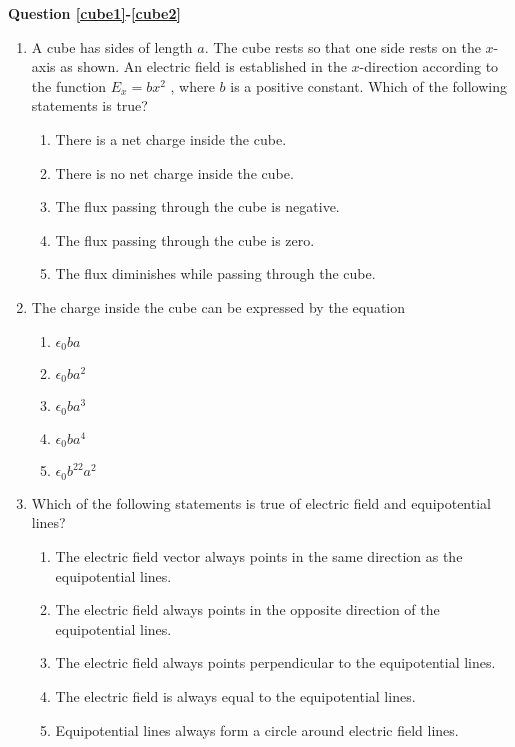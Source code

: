 \documentclass{../../../oss-apphys}
\begin{document}
\begin{multicols}{2}
  \textbf{Question \ref{cube1}-\ref{cube2}}
  \begin{enumerate}[leftmargin=18pt,resume]
  \item A cube has sides of length $a$. The cube rests so that one side rests on
    the $x$-axis as shown. An electric field is established in the $x$-direction
    according to the function $E_x=bx^2$ , where $b$ is a positive constant.
    Which of the following statements is true?
    \label{cube1}
    \begin{enumerate}[noitemsep,topsep=0pt,leftmargin=18pt,label=(\Alph*)]
    \item\vspace{-.2in}There is a net charge inside the cube.
    \item There is no net charge inside the cube.
    \item The flux passing through the cube is negative.
    \item The flux passing through the cube is zero.
    \item The flux diminishes while passing through the cube.
    \end{enumerate}

  \item The charge inside the cube can be expressed by the equation
    \label{cube2}
    \begin{enumerate}[noitemsep,topsep=0pt,leftmargin=18pt,label=(\Alph*)]
    \item $\epsilon_0ba$
    \item $\epsilon_0ba^2$
    \item $\epsilon_0ba^3$
    \item $\epsilon_0ba^4$
    \item $\epsilon_0b^22a^2$
    \end{enumerate}

  \item Which of the following statements is true of electric field and
    equipotential lines?
    \begin{enumerate}[noitemsep,topsep=0pt,leftmargin=18pt,label=(\Alph*)]
    \item The electric field vector always points in the same direction as the
      equipotential lines.
    \item The electric field always points in the opposite direction of the
      equipotential lines.
    \item The electric field always points perpendicular to the equipotential
      lines.
    \item The electric field is always equal to the equipotential lines.
    \item Equipotential lines always form a circle around electric field lines.
    \end{enumerate}


\end{enumerate}
\end{multicols}
\end{document}
